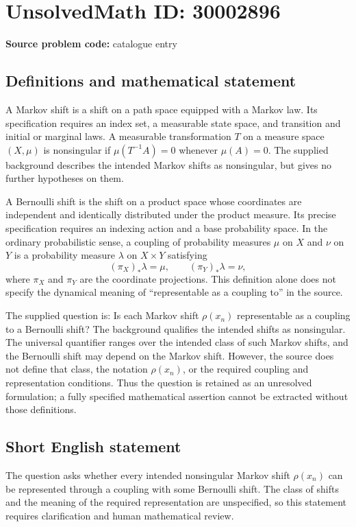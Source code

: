 \documentclass[11pt]{article}
\begin{document}
\section*{UnsolvedMath ID: 30002896}
\textbf{Source problem code:} catalogue entry
\subsection{Definitions and mathematical statement}
A Markov shift is a shift on a path space equipped with a Markov law. Its specification requires an index set, a measurable state space, and transition and initial or marginal laws. A measurable transformation \(T\) on a measure space \((X,\mu)\) is nonsingular if \(\mu(T^{-1}A)=0\) whenever \(\mu(A)=0\). The supplied background describes the intended Markov shifts as nonsingular, but gives no further hypotheses on them.

A Bernoulli shift is the shift on a product space whose coordinates are independent and identically distributed under the product measure. Its precise specification requires an indexing action and a base probability space. In the ordinary probabilistic sense, a coupling of probability measures \(\mu\) on \(X\) and \(\nu\) on \(Y\) is a probability measure \(\lambda\) on \(X\times Y\) satisfying
\[
(\pi_X)_*\lambda=\mu,\qquad (\pi_Y)_*\lambda=\nu,
\]
where \(\pi_X\) and \(\pi_Y\) are the coordinate projections. This definition alone does not specify the dynamical meaning of ``representable as a coupling to'' in the source.

The supplied question is: Is each Markov shift \(\rho(x_n)\) representable as a coupling to a Bernoulli shift? The background qualifies the intended shifts as nonsingular. The universal quantifier ranges over the intended class of such Markov shifts, and the Bernoulli shift may depend on the Markov shift. However, the source does not define that class, the notation \(\rho(x_n)\), or the required coupling and representation conditions. Thus the question is retained as an unresolved formulation; a fully specified mathematical assertion cannot be extracted without those definitions.
\subsection{Short English statement}
The question asks whether every intended nonsingular Markov shift \(\rho(x_n)\) can be represented through a coupling with some Bernoulli shift. The class of shifts and the meaning of the required representation are unspecified, so this statement requires clarification and human mathematical review.
\end{document}
